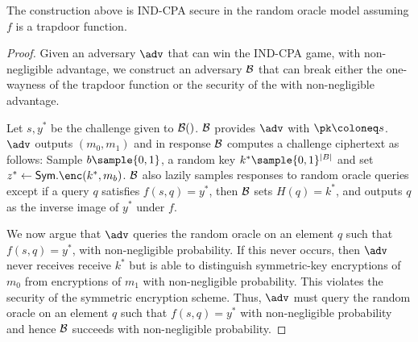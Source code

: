 \begin{theorem}
    The construction above is IND-CPA secure in the random oracle model assuming $f$ is a trapdoor function.
\end{theorem}
\begin{proof}
    Given an adversary $\adv$ that can win the IND-CPA game, with non-negligible advantage, we construct an adversary $\mathcal{B}$ that can break either the one-wayness of the trapdoor function or the security of the with non-negligible advantage.

    Let $s, y^*$ be the challenge given to $\mathcal{B}()$. $\mathcal{B}$ provides $\adv$ with $\pk \coloneq s$. $\adv$ outputs $(m_0, m_1)$ and in response $\mathcal{B}$ computes a challenge ciphertext as follows: Sample $b \sample \{0,1\}$, a random key $k^* \sample \{0,1\}^{|B|}$ and set $z^* \gets \mathsf{Sym}.\enc(k^*, m_b)$. $\mathcal{B}$ also lazily samples responses to random oracle queries except if a query $q$ satisfies $f(s, q) = y^*$, then $\mathcal{B}$ sets $H(q) = k^*$, and outputs $q$ as the inverse image of $y^*$ under $f$.

    We now argue that $\adv$ queries the random oracle on an element $q$ such that $f(s, q) = y^*$, with non-negligible probability. If this never occurs, then $\adv$ never receives receive $k^*$ but is able to distinguish symmetric-key encryptions of $m_0$ from encryptions of $m_1$ with non-negligible probability. This violates the security of the symmetric encryption scheme. Thus, $\adv$ must query the random oracle on an element $q$ such that $f(s, q) = y^*$ with non-negligible probability and hence $\mathcal{B}$ succeeds with non-negligible probability.
\end{proof}

